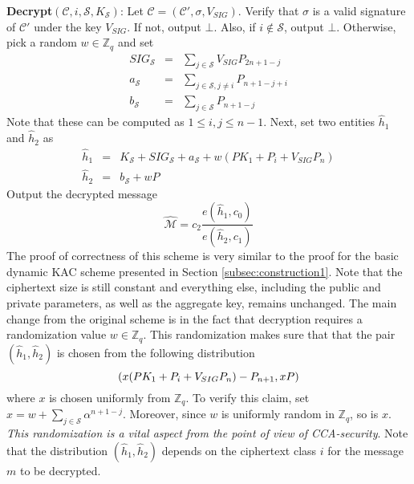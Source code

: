  \noindent \textbf{Decrypt}$(\mathcal{C},i,\mathcal{S},K_{\mathcal{S}})$: Let $\mathcal{C}=(\mathcal{C}',\sigma,V_{SIG})$. Verify that $\sigma$ is a valid signature of $\mathcal{C}'$ under the key $V_{SIG}$. If not, output $\bot$. Also, if $i\notin\mathcal{S}$, output $\bot$. Otherwise, pick a random $w\in \mathbb{Z}_q$ and set 
 \begin{eqnarray}
  SIG_{\mathcal{S}} &=& \sum_{j\in\mathcal{S}}V_{SIG}P_{2n+1-j}\nonumber\\
  a_{\mathcal{S}} &=& \sum_{j\in\mathcal{S},j\neq i}P_{n+1-j+i}\nonumber\\
  b_{\mathcal{S}} &=& \sum_{j\in\mathcal{S}}P_{n+1-j}\nonumber  
 \end{eqnarray}
 \noindent Note that these can be computed as $1\leq i,j \leq n-1$. Next, set two entities $\hat{h}_1$ and $\hat{h}_2$ as
 \begin{eqnarray}
  \hat{h}_1 &=& K_{\mathcal{S}} + SIG_{\mathcal{S}} + a_{\mathcal{S}} + w(PK_1+P_i+V_{SIG}P_n)\nonumber\\
  \hat{h}_2 &=& b_{\mathcal{S}}+wP \nonumber
 \end{eqnarray}
 \noindent Output the decrypted message 
 \begin{equation}
  \hat{\mathcal{M}} = c_2\frac{{e}(\hat{h}_1,c_0)}{{e}(\hat{h}_2,c_1)}\nonumber
 \end{equation}
\noindent The proof of correctness of this scheme is very similar to the proof for the basic dynamic KAC scheme presented in Section \ref{subsec:construction1}. Note that the ciphertext size is still constant and everything else, including the public and private parameters, as well as the aggregate key, remains unchanged. The main change from the original scheme is in the fact that decryption requires a randomization value $w\in\mathbb{Z}_q$. This randomization makes sure that that the pair $(\hat{h}_1,\hat{h}_2)$ is chosen from the following distribution 
\begin{equation}
(x(PK_1+P_i+V_{SIG}P_n)-P_{n+1},xP) \noindent
\end{equation}
\noindent where $x$ is chosen uniformly from $\mathbb{Z}_q$. To verify this claim, set $x=w+\sum_{j\in\mathcal{S}}\alpha^{n+1-j}$. Moreover, since $w$ is uniformly random in $\mathbb{Z}_q$, so is $x$. \emph{This randomization is a vital aspect from the point of view of CCA-security}. Note that the distribution $(\hat{h}_1,\hat{h}_2)$ depends on the ciphertext class $i$ for the message $m$ to be decrypted. 



